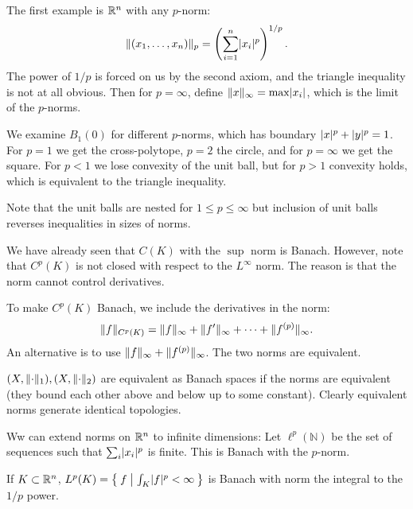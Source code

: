 \documentclass[10pt, twoside]{article}
\begin{document}
    \begin{exm} The first example is $\mathbb{R}^n$ with any $p$-norm: \[\lVert(x_1,
    \ldots, x_n)\rVert_p = \left( \sum_{i=1}^n \lvert x_i\rvert^p \right)^{1/p}.\] The
    power of $1/p$ is forced on us by the second axiom, and the triangle
    inequality is not at all obvious. Then for $p = \infty$, define
    $\lVert x\rVert_{\infty} = \max \lvert x_i\rvert$, which is the limit of the $p$-norms.

        We examine $B_1(0)$ for different $p$-norms, which has boundary
        $\lvert x\rvert^p + \lvert y\rvert^p = 1$. For $p = 1$ we get the cross-polytope,
        $p=2$ the circle, and for $p = \infty$ we get the square. For $p<1$ we
        lose convexity of the unit ball, but for $p>1$ convexity holds, which
        is equivalent to the triangle inequality.

        Note that the unit balls are nested for $1 \leq p \leq \infty$ but
    inclusion of unit balls reverses inequalities in sizes of norms.  \end{exm}
    
    \begin{exm} We have already seen that $C(K)$ with the $\sup$ norm is
        Banach. However, note that $C^p(K)$ is not closed with respect to the
        $L^{\infty}$ norm. The reason is that the norm cannot control
        derivatives.

        To make $C^p(K)$ Banach, we include the derivatives in the norm:
        \[\lVert f\rVert_{C^p(K)} = \lVert f\rVert_{\infty} + \lVert f'\rVert_{\infty} + \cdots +
        \lVert f^{(p)}\rVert_{\infty}.\] An alternative is to use $\lVert f\rVert_{\infty}
        + \lVert f^{(p)}\rVert_{\infty}$. The two norms are equivalent.  \end{exm}

    \begin{defn} $(X, \lVert\cdot\rVert_1), (X, \lVert\cdot\rVert_2)$ are equivalent as
    Banach spaces if the norms are equivalent (they bound each other above and
below up to some constant). Clearly equivalent norms generate identical
topologies.  \end{defn}

    \begin{exm} Ww can extend norms on $\mathbb{R}^n$ to infinite dimensions: Let
    $\ell^p(\mathbb{N})$ be the set of sequences such that $\sum_{i}
\lvert x_i\rvert^p$ is finite. This is Banach with the $p$-norm.  \end{exm}

    \begin{exm} If $K \subset \mathbb{R}^n$, $L^p(K) = \Set{f | \int_K \lvert f\rvert^p <
    \infty}$ is Banach with norm the integral to the $1/p$ power.  \end{exm}
\end{document}
